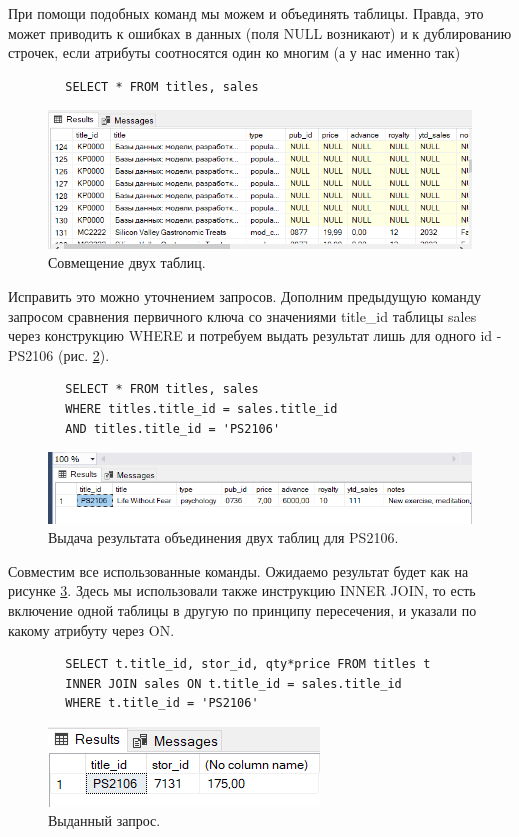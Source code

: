 При помощи подобных команд мы можем и объединять таблицы. Правда, это может приводить к ошибках в данных (поля NULL возникают) и к дублированию строчек, если атрибуты соотносятся один ко многим (а у нас именно так)

\begin{verbatim}
        SELECT * FROM titles, sales
\end{verbatim}
\begin{figure}[h!]
    \centering
    \includegraphics[width=0.9\linewidth]{Pic/lab4/SQ8.PNG}
    \caption{Совмещение двух таблиц.}
    \label{fig:enter-label}
\end{figure}

Исправить это можно уточнением запросов. Дополним предыдущую команду запросом сравнения первичного ключа со значениями title\_id таблицы sales через конструкцию WHERE и потребуем выдать результат лишь для одного id - PS2106 (рис. \ref{fig:SQ9}).

\begin{verbatim}
        SELECT * FROM titles, sales
        WHERE titles.title_id = sales.title_id 
        AND titles.title_id = 'PS2106'
\end{verbatim}
\begin{figure}[h!]
    \centering
    \includegraphics[width=0.9\linewidth]{Pic/lab4/SQ9.PNG}
    \caption{Выдача результата объединения двух таблиц для PS2106.}
    \label{fig:SQ9}
\end{figure}

Совместим все использованные команды. Ожидаемо результат будет как на рисунке \ref{fig:COcom}. Здесь мы использовали также инструкцию INNER JOIN, то есть включение одной таблицы в другую по принципу пересечения, и указали по какому атрибуту через ON. 

\begin{verbatim}
        SELECT t.title_id, stor_id, qty*price FROM titles t
        INNER JOIN sales ON t.title_id = sales.title_id
        WHERE t.title_id = 'PS2106'
\end{verbatim}
\begin{figure}[h!]
    \centering
    \includegraphics[width=0.5\linewidth]{Pic/lab4/SQ10.PNG}
    \caption{Выданный запрос.}
    \label{fig:COcom}
\end{figure}

